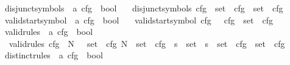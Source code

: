 \begin{isabellebody}
\ disjunct{\isacharunderscore}{\kern0pt}symbols\ {\isacharcolon}{\kern0pt}{\isacharcolon}{\kern0pt}\ {\isachardoublequoteopen}{\isacharprime}{\kern0pt}a\ cfg\ {\isasymRightarrow}\ bool{\isachardoublequoteclose}\ \isanewline
\ \ {\isachardoublequoteopen}disjunct{\isacharunderscore}{\kern0pt}symbols\ cfg\ {\isasymlongleftrightarrow}\ set\ {\isacharparenleft}{\kern0pt}{\isasymNN}\ cfg{\isacharparenright}{\kern0pt}\ {\isasyminter}\ set\ {\isacharparenleft}{\kern0pt}{\isasymTT}\ cfg{\isacharparenright}{\kern0pt}\ {\isacharequal}{\kern0pt}\ {\isacharbraceleft}{\kern0pt}{\isacharbraceright}{\kern0pt}{\isachardoublequoteclose}\isanewline
\isanewline
{}\isamarkupfalse%
\ valid{\isacharunderscore}{\kern0pt}startsymbol\ {\isacharcolon}{\kern0pt}{\isacharcolon}{\kern0pt}\ {\isachardoublequoteopen}{\isacharprime}{\kern0pt}a\ cfg\ {\isasymRightarrow}\ bool{\isachardoublequoteclose}\ \isanewline
\ \ {\isachardoublequoteopen}valid{\isacharunderscore}{\kern0pt}startsymbol\ cfg\ {\isasymlongleftrightarrow}\ {\isasymSS}\ cfg\ {\isasymin}\ set\ {\isacharparenleft}{\kern0pt}{\isasymNN}\ cfg{\isacharparenright}{\kern0pt}{\isachardoublequoteclose}\isanewline
\isanewline
{}\isamarkupfalse%
\ valid{\isacharunderscore}{\kern0pt}rules\ {\isacharcolon}{\kern0pt}{\isacharcolon}{\kern0pt}\ {\isachardoublequoteopen}{\isacharprime}{\kern0pt}a\ cfg\ {\isasymRightarrow}\ bool{\isachardoublequoteclose}\ \isanewline
\ \ {\isachardoublequoteopen}valid{\isacharunderscore}{\kern0pt}rules\ cfg\ {\isasymlongleftrightarrow}\ {\isacharparenleft}{\kern0pt}{\isasymforall}{\isacharparenleft}{\kern0pt}N{\isacharcomma}{\kern0pt}\ {\isasymalpha}{\isacharparenright}{\kern0pt}\ {\isasymin}\ set\ {\isacharparenleft}{\kern0pt}{\isasymRR}\ cfg{\isacharparenright}{\kern0pt}{\isachardot}{\kern0pt}\ N\ {\isasymin}\ set\ {\isacharparenleft}{\kern0pt}{\isasymNN}\ cfg{\isacharparenright}{\kern0pt}\ {\isasymand}\ {\isacharparenleft}{\kern0pt}{\isasymforall}s\ {\isasymin}\ set\ {\isasymalpha}{\isachardot}{\kern0pt}\ s\ {\isasymin}\ set\ {\isacharparenleft}{\kern0pt}{\isasymNN}\ cfg{\isacharparenright}{\kern0pt}\ {\isasymunion}\ set\ {\isacharparenleft}{\kern0pt}{\isasymTT}\ cfg{\isacharparenright}{\kern0pt}{\isacharparenright}{\kern0pt}{\isacharparenright}{\kern0pt}{\isachardoublequoteclose}\isanewline
\isanewline
{}\isamarkupfalse%
\ distinct{\isacharunderscore}{\kern0pt}rules\ {\isacharcolon}{\kern0pt}{\isacharcolon}{\kern0pt}\ {\isachardoublequoteopen}{\isacharprime}{\kern0pt}a\ cfg\ {\isasymRightarrow}\ bool{\isachardoublequoteclose}\ \isanewline

\end{isabellebody}
